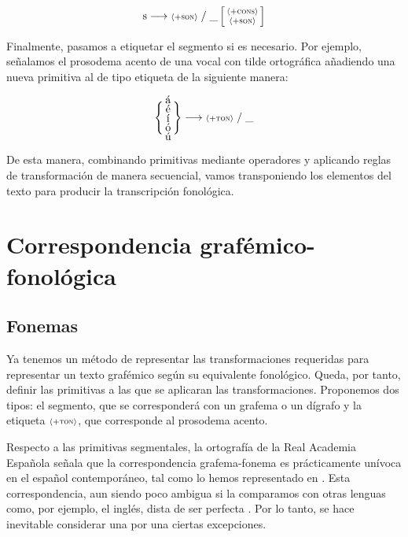 \[\text{s} \longrightarrow  {\scriptstyle\langle{}+\textsc{son}\rangle{}} \;/\; \_  \left[  \begin{smallmatrix} {\scriptstyle\langle{}+\textsc{cons}\rangle{}}  \\ { \scriptstyle\langle{}+\textsc{son}\rangle{}} \end{smallmatrix} \right] \]

Finalmente, pasamos a etiquetar el segmento si es necesario. Por ejemplo, señalamos el prosodema acento de una vocal con tilde ortográfica añadiendo una nueva primitiva al de tipo etiqueta de la siguiente manera:

 \[\Bigg\{ \begin{smallmatrix}
 	\text{\normalsize{á}} \\
 	\text{\normalsize{é}} \\
 	\text{\normalsize{í}}  \\
 	\text{\normalsize{ó}} \\
 	\text{\normalsize{ú}} \\
 \end{smallmatrix}\Bigg\}   \longrightarrow {\scriptstyle\langle{}+\textsc{ton}\rangle{}} \;/\; \_ \]

De esta manera, combinando primitivas mediante operadores y aplicando reglas de transformación de manera secuencial, vamos transponiendo los elementos del texto para producir la transcripción fonológica.

\section{Correspondencia grafémico-fonológica}
\subsection{Fonemas}
Ya tenemos un método de representar las transformaciones requeridas para representar un texto grafémico según su equivalente fonológico. Queda, por tanto, definir las primitivas a las que se aplicaran las transformaciones. Proponemos dos tipos: el segmento, que se corresponderá con un grafema o un dígrafo y la etiqueta  ${\scriptstyle\langle{}+\textsc{ton}\rangle{}}$, que corresponde al prosodema acento. 
 
Respecto a las primitivas segmentales, la ortografía de la Real Academia Española señala que la correspondencia grafema-fonema es prácticamente unívoca en el español contemporáneo, tal como lo hemos representado en . Esta correspondencia, aun siendo poco ambigua si la comparamos con otras lenguas como, por ejemplo, el inglés, dista de ser perfecta  \parencite[87-199]{rae2010}. Por lo tanto, se hace inevitable considerar una por una ciertas excepciones.

